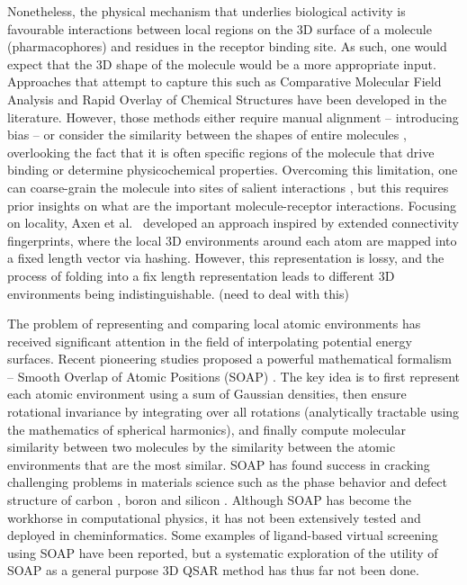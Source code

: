 Nonetheless, the physical mechanism that underlies biological activity is favourable interactions between local regions on the 3D surface of a molecule (pharmacophores) and residues in the receptor binding site. As such, one would expect that the 3D shape of the molecule would be a more appropriate input. Approaches that attempt to capture this such as Comparative Molecular Field Analysis \cite{cramer1988comparative,clark1990comparative} and Rapid Overlay of Chemical Structures \cite{rush2005shape} have been developed in the literature. However, those methods either require manual alignment \cite{cramer1988comparative,clark1990comparative} --  introducing bias -- or consider the similarity between the shapes of entire molecules \cite{masek1993molecular,rush2005shape}, overlooking the fact that it is often specific regions of the molecule that drive binding or determine physicochemical properties. Overcoming this limitation, one can coarse-grain the molecule into sites of salient interactions \cite{jenkins20043d}, but this requires prior insights on what are the important molecule-receptor interactions. Focusing on locality, Axen et al.~\cite{axen2017simple} developed an approach inspired by extended connectivity fingerprints, where the local 3D environments around each atom are mapped into a fixed length vector via hashing. However, this representation is lossy, and the process of folding into a fix length representation leads to different 3D environments being indistinguishable. (need to deal with this)

The problem of representing and comparing local atomic environments has received significant attention in the field of interpolating potential energy surfaces. Recent pioneering studies proposed a powerful mathematical formalism -- Smooth Overlap of Atomic Positions (SOAP) \cite{bartok2013representing}. The key idea is to first represent each atomic environment using a sum of Gaussian densities, then ensure rotational invariance by integrating over all rotations (analytically tractable using the mathematics of spherical harmonics), and finally compute molecular similarity between two molecules by the similarity between the atomic environments that are the most similar. SOAP has found success in cracking challenging problems in materials science such as the phase behavior and defect structure of carbon \cite{caro2018growth}, boron \cite{deringer2018data} and silicon \cite{bartok2018machine}. Although SOAP has become the workhorse in computational physics, it has not been extensively tested and deployed in cheminformatics. Some examples of ligand-based virtual screening using SOAP \cite{bartok2017machine} have been reported, but a systematic exploration of the utility of SOAP as a general purpose 3D QSAR method has thus far not been done. 

